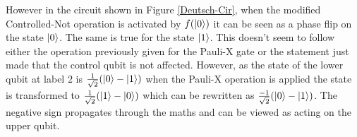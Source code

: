 % 
% 
% 

However in the circuit shown in Figure \ref{Deutsch-Cir}, when the modified Controlled-Not operation is activated by $f(\left\vert{0}\right\rangle)$ it can be seen as a phase flip on the state $\left\vert{0}\right\rangle$.
The same is true for the state $\left\vert{1}\right\rangle$.
This doesn't seem to follow either the operation previously given for the Pauli-X gate or the statement just made that the control qubit is not affected.
However, as the state of the lower qubit at label $2$ is $\frac{1}{\sqrt{2}}(\left\vert{0}\right\rangle-\left\vert{1}\right\rangle)$ when the Pauli-X operation is applied the state is transformed to $\frac{1}{\sqrt{2}}(\left\vert{1}\right\rangle-\left\vert{0}\right\rangle)$ which can be rewritten as $\frac{-1}{\sqrt{2}}(\left\vert{0}\right\rangle-\left\vert{1}\right\rangle)$.
The negative sign propagates through the maths and can be viewed as acting on the upper qubit.

